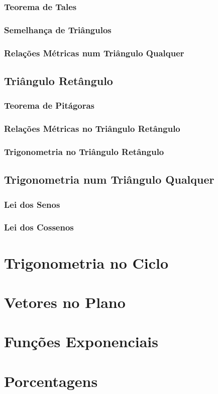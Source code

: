 \documentclass[12pt,a4paper]{book}
\begin{document}
		\subsection{Teorema de Tales}
		\subsection{Semelhança de Triângulos}
		\subsection{Relações Métricas num Triângulo Qualquer}
	\section{Triângulo Retângulo}
		\subsection{Teorema de Pitágoras}
		\subsection{Relações Métricas no Triângulo Retângulo}
		\subsection{Trigonometria no Triângulo Retângulo}
	\section{Trigonometria num Triângulo Qualquer}
		\subsection{Lei dos Senos}
		\subsection{Lei dos Cossenos}
\chapter{Trigonometria no Ciclo}
\chapter{Vetores no Plano}
\chapter{Funções Exponenciais}
\chapter{Porcentagens}
\end{document}
